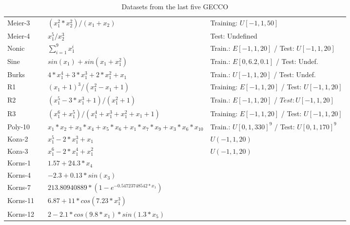 \begin{table*}[htbp]
\scriptsize
\caption{Datasets from the last five GECCO}
\begin{center}
\begin{tabular}{llll}

Meier-3  & \cite{meier2013accelerating} & $(x_1^2*x_2^2)/(x_1+x_2)$ & Training: $U[-1,1,50]$ \\ 
Meier-4  & \cite{meier2013accelerating} & $x_1^5/x_2^3$ &  Test: Undefined \\ 
Nonic & \cite{krawiec2013approximating,szubert2016reducing} & $\sum\limits_{i=1}^9 x_1^i$ & Train.: $E[-1,1,20]$ / Test: $U[-1,1,20]$ \\ 
Sine & \cite{mcphee2015impact} & $sin(x_1)+sin(x_1+x_1^2)$ & Train.: $E[0,6.2,0.1]$ / Test: Undef. \\ 
Burks & \cite{burks2015efficient,szubert2016reducing} & $4*x_1^4+3*x_1^3+2*x_1^2+x_1$ & Train.: $U[-1,1,20]$ / Test: Undef. \\ 
R1 & \cite{krawiec2013approximating,szubert2016reducing,liskowski2017discovery} & $(x_1+1)^3/(x_1^2-x_1+1)$ & Training: $E[-1,1,20]$ / Test: $U[-1,1,20]$ \\ 
R2 & \cite{krawiec2013approximating,szubert2016reducing,liskowski2017discovery} & $(x_1^5-3*x_1^3+1)/(x_1^2+1)$ & Train.: $E[-1,1,20]$ / $Test: U[-1,1,20]$ \\ 
R3 & \cite{liskowski2017discovery} & $(x_1^6+x_1^5)/(x_1^4+x_1^3+x_1^2+x_1+1)$ & Training: $E[-1,1,20]$ / Test: $U[-1,1,20]$  \\ 

Poly-10 & \cite{medernach2016new} & $x_1*x_2+x_3*x_4+x_5*x_6+x_1*x_7*x_9+x_3*x_6*x_10$ & Train.: $U[0,1,330]^{9}$ / Test: $U[0,1,170]^{9}$ \\ 
Koza-2 & \cite{meier2013accelerating} & $x_1^5-2*x_1^3+x_1$ & $U(-1, 1, 20)$ \\ 
Koza-3 & \cite{meier2013accelerating, harada2014asynchronously} & $x_1^6-2*x_1^4+x_1^2$ & $U(-1, 1, 20)$ \\ 
Korns-1 & \cite{worm2013prioritized} & $1.57+24.3*x_4$ &  \\  
Korns-4 & \cite{worm2013prioritized} & $-2.3+0.13*sin(x_3)$ &  \\ 
Korns-7 & \cite{worm2013prioritized} & $213.80940889*(1-e^{-0.54723748542*x_1})$ &  \\ 
Korns-11 & \cite{worm2013prioritized} & $6.87+11*cos(7.23*x_1^3)$ &  \\ 
Korns-12 & \cite{worm2013prioritized} & $2-2.1*cos(9.8*x_1)*sin(1.3*x_5)$ &  \\ 


\end{tabular}
\end{center}
\end{table*}
